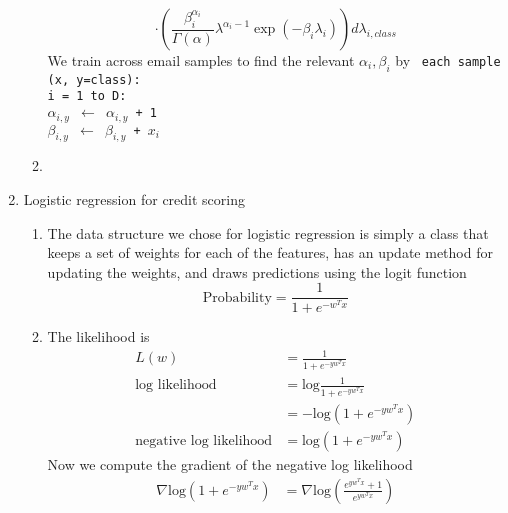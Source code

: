 \documentclass{article}
\begin{document}
\begin{enumerate}
\begin{enumerate}
\begin{equation*}
                  \cdot\left(\frac{\beta_i^{\alpha_i}}{\Gamma(\alpha)}\lambda^{\alpha_i-1}
                  \exp(-\beta_i\lambda_i)\right) d\lambda_{i,class}
                \end{equation*}
                We train across email samples to find the relevant \(\alpha_i,\beta_i\) by
                \texttt{
                  \tabfor each sample (x, y=class): \\
                  \tab\tabfor i = 1 to D: \\
                  \tab\tab\tab\(\alpha_{i,y}\) \(\leftarrow\) \(\alpha_{i,y}\) + 1 \\
                  \tab\tab\tab\(\beta_{i,y}\) \(\leftarrow\) \(\beta_{i,y}\) + \(x_i\)
                }   
            \item %
        \end{enumerate}
    \item Logistic regression for credit scoring %
        \begin{enumerate}
            \item %
                The data structure we chose for logistic regression is
                simply a class that keeps a set of weights for each of the
                features, has an update method for updating the weights,
                and draws predictions using the logit function
                \begin{equation*}
                    \text{Probability} = \frac{1}{1 + e^{-w^Tx}}
                \end{equation*}
            \item %
                The likelihood is
                \begin{align*}
                    L(w) 
                        &= \frac{1}{1 + e^{-yw^Tx}} \\
                    \text{log likelihood} 
                        &= \text{log}\frac{1}{1 + e^{-yw^Tx}} \\
                        &= -\text{log} (1 + e^{-yw^Tx}) \\
                    \text{negative log likelihood}
                        &= \text{log} (1 + e^{-yw^Tx})
                \end{align*}
                Now we compute the gradient of the negative log likelihood
                \begin{align*}
                    \nabla \text{log} (1 + e^{-yw^Tx})
                        &= \nabla \text{log} \left( \frac{e^{yw^Tx} + 1}
                            {e^{yw^Tx}} \right) \\

\end{align*}
\end{enumerate}
\end{enumerate}
\end{document}

